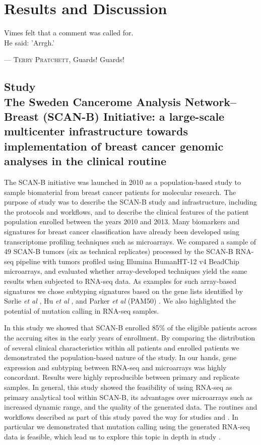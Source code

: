 \documentclass[11pt]{book}
\newcommand{\scanb}{\mbox{SCAN-B}}
\begin{document}
\chapter{Results and Discussion}

\epigraph{Vimes felt that a comment was called for. \\ He said: 'Arrgh.'}{--- \textsc{Terry Pratchett}\small\textnormal{, Guards! Guards!}}

\section*{Study \I \\ The Sweden Cancerome Analysis Network--Breast (\scanb{}) Initiative: a large-scale multicenter infrastructure towards implementation of breast cancer genomic analyses in the clinical routine}

The \scanb{} initiative was launched in 2010 as a population-based study to sample biomaterial from breast cancer patients for molecular research. The purpose of study \I was to describe the \scanb{} study and infrastructure, including the protocols and workflows, and to describe the clinical features of the patient population enrolled between the years 2010 and 2013. Many biomarkers and signatures for breast cancer classification have already been developed using transcriptome profiling techniques such as microarrays. We compared a sample of 49 \scanb{} tumors (six as technical replicates) processed by the \scanb{} RNA-seq pipeline with tumors profiled using Illumina HumanHT-12 v4 BeadChip microarrays, and evaluated whether array-developed techniques yield the same results when subjected to RNA-seq data. As examples for such array-based signatures we chose subtyping signatures based on the gene lists identified by Sørlie \textit{et al} \cite{Sorlie:2003}, Hu \textit{et al} \cite{Hu:2006}, and Parker \textit{et al} (PAM50) \cite{Parker:2009}. We also highlighted the potential of mutation calling in RNA-seq samples.

In this study we showed that \scanb{} enrolled 85\% of the eligible patients across the accruing sites in the early years of enrollment. By comparing the distribution of several clinical characteristics within all patients and enrolled patients we demonstrated the population-based nature of the study. In our hands, gene expression and subtyping between RNA-seq and microarrays was highly concordant. Results were highly reproducible between primary and replicate samples. In general, this study showed the feasibility of using RNA-seq as primary analytical tool within \scanb{}, its advantages over microarrays such as increased dynamic range, and the quality of the generated data. The routines and workflows described as part of this study paved the way for studies \III and \IV. In particular we demonstrated that mutation calling using the generated RNA-seq data is feasible, which lead us to explore this topic in depth in study \IV.
\end{document}
